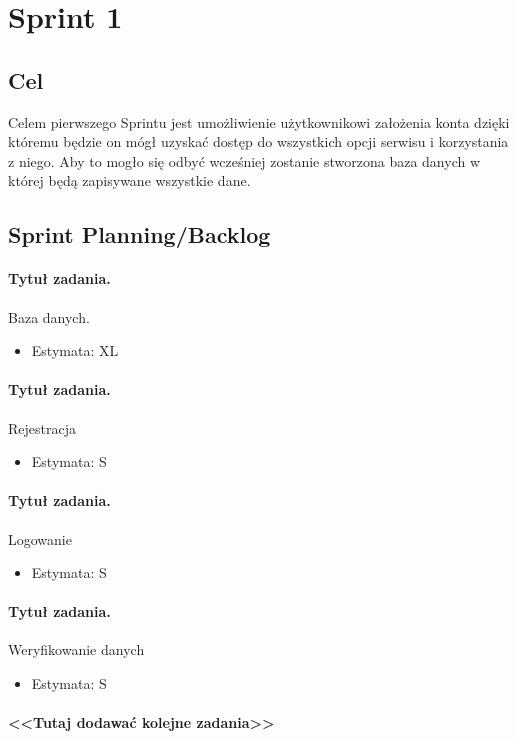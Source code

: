 \documentclass[a4paper]{article}
\begin{document}
	\section{Sprint 1}
	\subsection{Cel} Celem pierwszego Sprintu jest umożliwienie użytkownikowi założenia konta dzięki któremu będzie on mógł uzyskać dostęp do wszystkich opcji serwisu i korzystania z niego. Aby to mogło się odbyć wcześniej zostanie stworzona baza danych w której będą zapisywane wszystkie dane.
	\subsection{Sprint Planning/Backlog}
	
	\paragraph{Tytuł zadania.} Baza danych.
	\begin{itemize}
		\item Estymata: XL
	\end{itemize}
	
	\paragraph{Tytuł zadania.} Rejestracja
	\begin{itemize}
		\item Estymata: S
	\end{itemize}
	
	\paragraph{Tytuł zadania.} Logowanie
	\begin{itemize}
		\item Estymata: S
	\end{itemize}
	
	\paragraph{Tytuł zadania.} Weryfikowanie danych
	\begin{itemize}
		\item Estymata: S
	\end{itemize}
	
	
	
	
	\paragraph{<<Tutaj dodawać kolejne zadania>>}
	
\end{document}
